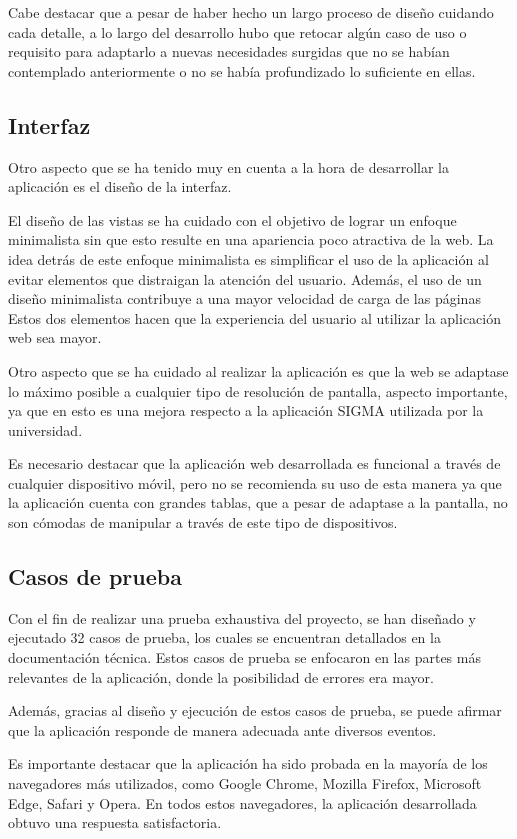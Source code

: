 Cabe destacar que a pesar de haber hecho un largo proceso de diseño cuidando cada detalle, a lo largo del desarrollo hubo que retocar algún caso de uso o requisito para adaptarlo a nuevas necesidades surgidas que no se habían contemplado anteriormente o no se había profundizado lo suficiente en ellas.

\subsection{Interfaz}
Otro aspecto que se ha tenido muy en cuenta a la hora de desarrollar la aplicación es el diseño de la interfaz.

El diseño de las vistas se ha cuidado con el objetivo de lograr un enfoque minimalista sin que esto resulte en una apariencia poco atractiva de la web. 
La idea detrás de este enfoque minimalista es simplificar el uso de la aplicación al evitar elementos que distraigan la atención del usuario.
Además, el uso de un diseño minimalista contribuye a una mayor velocidad de carga de las páginas
Estos dos elementos hacen que la experiencia del usuario al utilizar la aplicación web sea mayor.

Otro aspecto que se ha cuidado al realizar la aplicación es que la web se adaptase lo máximo posible a cualquier tipo de resolución de pantalla, aspecto importante, ya que en esto es una mejora respecto a la aplicación SIGMA utilizada por la universidad.

Es necesario destacar que la aplicación web desarrollada es funcional a través de cualquier dispositivo móvil, pero no se recomienda su uso de esta manera ya que la aplicación cuenta con grandes tablas, que a pesar de adaptase a la pantalla, no son cómodas de manipular a través de este tipo de dispositivos.

\subsection{Casos de prueba}
Con el fin de realizar una prueba exhaustiva del proyecto, se han diseñado y ejecutado 32 casos de prueba, los cuales se encuentran detallados en la documentación técnica. Estos casos de prueba se enfocaron en las partes más relevantes de la aplicación, donde la posibilidad de errores era mayor.

Además, gracias al diseño y ejecución de estos casos de prueba, se puede afirmar que la aplicación responde de manera adecuada ante diversos eventos.

Es importante destacar que la aplicación ha sido probada en la mayoría de los navegadores más utilizados, como Google Chrome, Mozilla Firefox, Microsoft Edge, Safari y Opera. En todos estos navegadores, la aplicación desarrollada obtuvo una respuesta satisfactoria.

